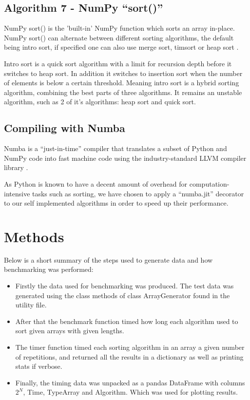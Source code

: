 \documentclass[sigconf, nonacm, natbib, screen, balance=False]{acmart}
\begin{document}
\subsection{Algorithm 7 - NumPy ``sort()'' }\label{sec:algo7}

NumPy sort() is the 'built-in' NumPy function which sorts an array in-place. NumPy sort() can alternate between different sorting algorithms, the default being intro sort, if specified one can also use merge sort, timsort or heap sort \cite{WhatisNu65:online}. 

Intro sort is a quick sort algorithm with a limit for recursion depth before it switches to heap sort. In addition it switches to insertion sort when the number of elements is below a certain threshold. Meaning intro sort is a hybrid sorting algorithm, combining the best parts of three algorithms. It remains an unstable algorithm, such as 2 of it's algorithms: heap sort and quick sort.

\subsection{Compiling with Numba}\label{sec:numba}

Numba is a ``just-in-time'' compiler that translates a subset of Python and NumPy code into fast machine code using the industry-standard LLVM compiler library \cite{NumbaAHi16:online}.

As Python is known to have a decent amount of overhead for computation-intensive tasks such as sorting, we have chosen to apply a ``numba.jit'' decorator to our self implemented algorithms in order to speed up their performance.

\section{Methods}\label{sec:methods}

Below is a short summary of the steps used to generate data and how benchmarking was performed:
\begin{itemize}
\item Firstly the data used for benchmarking was produced. The test data was generated using the class methods of class ArrayGenerator found in the utility file.
\item After that the benchmark function timed how long each algorithm used to sort given arrays with given lengths.  
\item The timer function timed each sorting algorithm in an array a given number of repetitions, and returned all the results in a dictionary as well as printing stats if verbose.
\item Finally, the timing data was unpacked as a pandas DataFrame with columns $2^N$, Time, TypeArray and Algorithm. Which was used for plotting results. 
\end{itemize}
\end{document}
